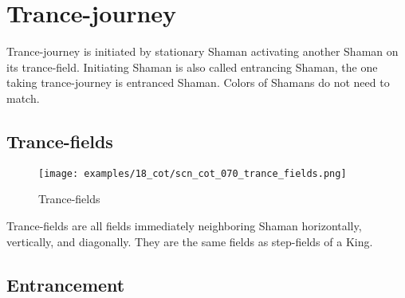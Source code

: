 \clearpage %

\section*{Trance-journey}
\label{sec:Conquest of Tlalocan/Trance-journey}

\vspace*{-0.7\baselineskip}
Trance-journey is initiated by stationary Shaman activating another Shaman
on its trance-field. Initiating Shaman is also called entrancing Shaman, the
one taking trance-journey is entranced Shaman.
Colors of Shamans do not need to match.

\vspace*{-0.7\baselineskip}
\subsection*{Trance-fields}
\label{sec:Conquest of Tlalocan/Trance-journey/Trance-fields}

\vspace*{-0.9\baselineskip}
\noindent
\begin{wrapfigure}[5]{l}{0.4\textwidth}
\centering
\texttt{[image: examples/18\_cot/scn\_cot\_070\_trance\_fields.png]}
\vspace*{-0.4\baselineskip}
\caption{Trance-fields}
\label{fig:scn_cot_070_trance_fields}
\end{wrapfigure}
Trance-fields are all fields immediately neighboring Shaman horizontally,
vertically, and diagonally. They are the same fields as step-fields of a King.

\vspace*{2.3\baselineskip}

\subsection*{Entrancement}
\label{sec:Conquest of Tlalocan/Trance-journey/Entrancement}

